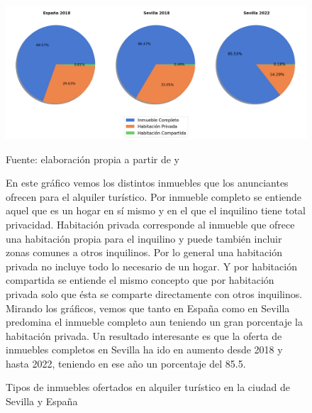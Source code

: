 \documentclass[a4paper,10pt]{article}
\begin{document}
            \begin{figure}[ht]
                \begin{center}
                    \includegraphics*[width = 16cm]{graphics/tipoinmueble.png}
                    \begin{flushright}
                        \footnotesize{Fuente: elaboración propia a partir de \cite[(1) y (2)]{datahippo} y \cite[(1)]{insideairbnb}}
                    \end{flushright}
                    \caption{Tipos de inmuebles ofertados en alquiler turístico en la ciudad de Sevilla y España}
                \end{center}

                En este gráfico vemos los distintos inmuebles que los anunciantes ofrecen para el alquiler turístico. Por inmueble
                completo se entiende aquel que es un hogar en sí mismo y en el que el inquilino tiene total privacidad. Habitación privada
                corresponde al inmueble que ofrece una habitación propia para el inquilino y puede también incluir zonas 
                comunes a otros inquilinos. Por lo general una habitación privada no incluye todo lo necesario de un hogar. Y por habitación 
                compartida se entiende el mismo concepto que por habitación privada solo que ésta se comparte directamente con otros inquilinos. 
                Mirando los gráficos, vemos que tanto en España como en Sevilla predomina el inmueble completo aun teniendo un gran porcentaje 
                la habitación privada. Un resultado interesante es que la oferta de inmuebles completos en Sevilla ha ido en aumento desde 2018 
                y hasta 2022, teniendo en ese año un porcentaje del 85.5.

            \end{figure}

            \clearpage
\end{document}
